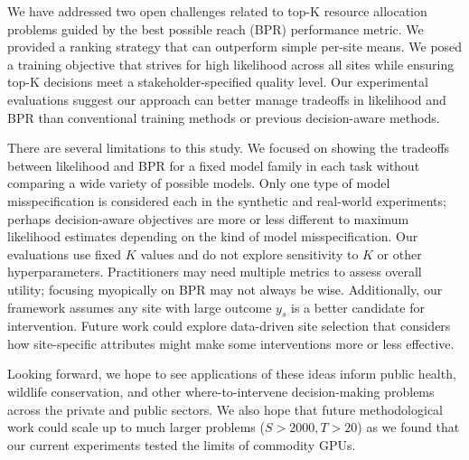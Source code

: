 We have addressed two open challenges related to top-K resource allocation problems guided by the best possible reach (BPR) performance metric. We provided a ranking strategy that can outperform simple per-site means. We posed a training objective that strives for high likelihood across all sites while ensuring top-K decisions meet a stakeholder-specified quality level.
Our experimental evaluations suggest our approach can better manage tradeoffs in likelihood and BPR than conventional training methods or previous decision-aware methods.

There are several limitations to this study. 
We focused on showing the tradeoffs between likelihood and BPR for a fixed model family in each task without comparing a wide variety of possible models.
Only one type of model misspecification is considered each in the synthetic and real-world experiments; perhaps  decision-aware objectives are more or less different to maximum likelihood estimates depending on the kind of model misspecification.
Our evaluations use fixed $K$ values and do not explore sensitivity to $K$ or other hyperparameters.
Practitioners may need multiple metrics to assess overall utility; focusing myopically on BPR may not always be wise.
Additionally, our framework assumes any site with large outcome $y_s$ is a better candidate for intervention. Future work could explore data-driven site selection that considers how site-specific attributes might make some interventions more or less effective. 


Looking forward, we hope to see applications of these ideas inform public health, wildlife conservation, and other where-to-intervene decision-making problems across the private and public sectors. We also hope that future methodological work could scale up to much larger problems ($S > 2000, T > 20$) as we found that our current experiments tested the limits of commodity GPUs.




